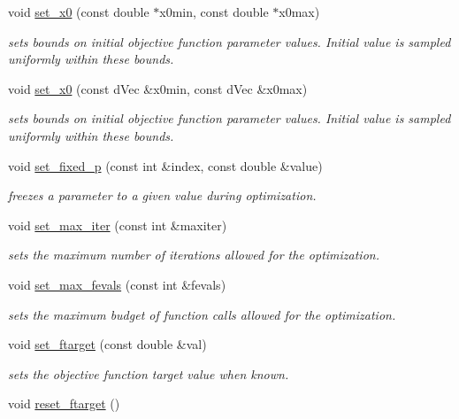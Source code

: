 \begin{DoxyCompactItemize}
void \hyperlink{classlibcmaes_1_1Parameters_addda8e395450878e87538df7b4032cbe}{set\-\_\-x0} (const double $\ast$x0min, const double $\ast$x0max)
\begin{DoxyCompactList}\small\item\em sets bounds on initial objective function parameter values. Initial value is sampled uniformly within these bounds. \end{DoxyCompactList}\item 
void \hyperlink{classlibcmaes_1_1Parameters_acc94e18faebb18dcaa0712a296e76949}{set\-\_\-x0} (const d\-Vec \&x0min, const d\-Vec \&x0max)
\begin{DoxyCompactList}\small\item\em sets bounds on initial objective function parameter values. Initial value is sampled uniformly within these bounds. \end{DoxyCompactList}\item 
void \hyperlink{classlibcmaes_1_1Parameters_a30236ca44b7de58b160bf2b1170f69b2}{set\-\_\-fixed\-\_\-p} (const int \&index, const double \&value)
\begin{DoxyCompactList}\small\item\em freezes a parameter to a given value during optimization. \end{DoxyCompactList}\item 
void \hyperlink{classlibcmaes_1_1Parameters_acefab965b50d45c6609e4f3267785ace}{set\-\_\-max\-\_\-iter} (const int \&maxiter)
\begin{DoxyCompactList}\small\item\em sets the maximum number of iterations allowed for the optimization. \end{DoxyCompactList}\item 
void \hyperlink{classlibcmaes_1_1Parameters_aa924cb4c8ffee0d148b63f5c0b55b4ce}{set\-\_\-max\-\_\-fevals} (const int \&fevals)
\begin{DoxyCompactList}\small\item\em sets the maximum budget of function calls allowed for the optimization. \end{DoxyCompactList}\item 
void \hyperlink{classlibcmaes_1_1Parameters_a6ace7e5d230fcf82c70ba2dd3a801f97}{set\-\_\-ftarget} (const double \&val)
\begin{DoxyCompactList}\small\item\em sets the objective function target value when known. \end{DoxyCompactList}\item 
\hypertarget{classlibcmaes_1_1Parameters_aec14ab6c39a12e347080fa7e0f2e7c9f}{void \hyperlink{classlibcmaes_1_1Parameters_aec14ab6c39a12e347080fa7e0f2e7c9f}{reset\-\_\-ftarget} ()}\label{classlibcmaes_1_1Parameters_aec14ab6c39a12e347080fa7e0f2e7c9f}


\end{DoxyCompactItemize}
